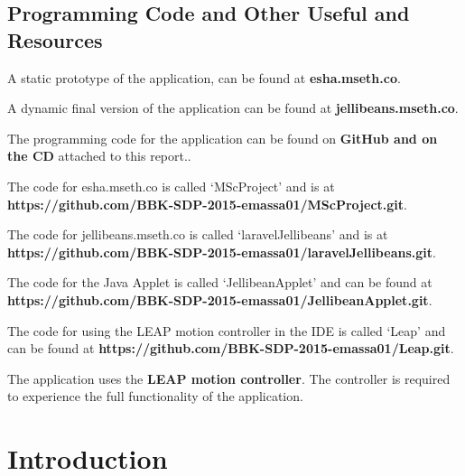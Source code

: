 \documentclass[a4paper, 11pt]{article}
\begin{document}
\begin{center}
\section*{Programming Code and Other Useful and Resources}

A static prototype of the application, can be found at \textbf{esha.mseth.co}.

\vspace{10mm}
A dynamic final version of the application can be found at \textbf{jellibeans.mseth.co}.

\vspace{10mm}
The programming code for the application can be found on \textbf{GitHub and on the CD} attached to this report..

\vspace{5mm}
The code for esha.mseth.co is called `MScProject' and is at \textbf{https://github.com/BBK-SDP-2015-emassa01/MScProject.git}.

\vspace{5mm}
The code for jellibeans.mseth.co is called `laravelJellibeans' and is at \textbf{https://github.com/BBK-SDP-2015-emassa01/laravelJellibeans.git}.

\vspace{5mm}
The code for the Java Applet is called `JellibeanApplet' and can be found at \textbf{https://github.com/BBK-SDP-2015-emassa01/JellibeanApplet.git}.

\vspace{5mm}
The code for using the LEAP motion controller in the IDE is called `Leap' and can be found at \textbf{https://github.com/BBK-SDP-2015-emassa01/Leap.git}.

\vspace{10mm}
The application uses the \textbf{LEAP motion controller}. The controller is required to experience the full functionality of the application.
\end{center}

\clearpage

\section{Introduction}\label{intro}

\end{document}
